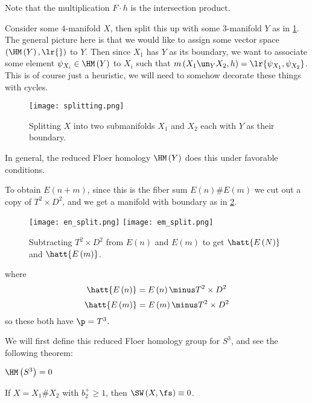 \documentclass{amsart}
\begin{document}
Note that the multiplication $F\cdot h$ is the intersection product.

Consider some $4$-manifold $X$, then split this up with some $3$-manifold $Y$
as in \cref{fig:splitting}.
The general picture here is that we would like to assign some vector space
$\left( \HM\left( Y \right) , \lr{} \right)$ to $Y$.
Then since $X_1$ has $Y$ as its boundary, we want to
associate some element $\psi_{X_i} \in \HM\left( Y \right)$ to $X_i$ such
that $m\left( X_1 \un_Y X_2,h \right) = \lr{\psi_{X_1} , \psi_{X_2}}$.
This is of course just a heuristic, we will need to somehow decorate 
these things with cycles.

\begin{figure}
\texttt{[image: splitting.png]}
\caption{Splitting $X$ into two submanifolds $X_1$ and $X_2$ each with 
$Y$ as their boundary.}
\label{fig:splitting}
\end{figure}

In general, the reduced Floer homology $\HM\left( Y \right)$ 
does this under favorable conditions. 

\begin{exm}
To obtain $E\left( n+m \right)$, since this is the fiber sum $E\left( n \right) \# E\left( m \right)$
we cut out a copy of $T^2 \times D^2$, and 
we get a manifold with boundary as in \cref{fig:en_splitting}.
\begin{figure}
\texttt{[image: en\_split.png]}
\texttt{[image: em\_split.png]}
\caption{Subtracting $T^2 \times D^2$ from $E\left( n \right)$ and $E\left( m \right)$ to get
$\hatt{E\left( N \right)}$ and $\hatt{E\left( m \right)}$.}
\label{fig:en_splitting}
\end{figure}
where
\begin{equation}
\hatt{E\left( n \right)} = E\left( n \right) \minus T^2 \times D^2
\end{equation}
\begin{equation}
\hatt{E\left( m \right)} = E\left( m \right) \minus T^2 \times D^2
\end{equation}
so these both have $\p = T^3$.
\end{exm}

We will first define this reduced Floer homology group for $S^3$, and see the following theorem:
\begin{thm}
$\HM\left( S^3 \right)= 0$
\end{thm}

\begin{cor}
If $X = X_1 \# X_2$ with $b_2^+ \geq 1$, then
$\SW\left( X , \fs \right) \equiv 0$.
\end{cor}
\end{document}
